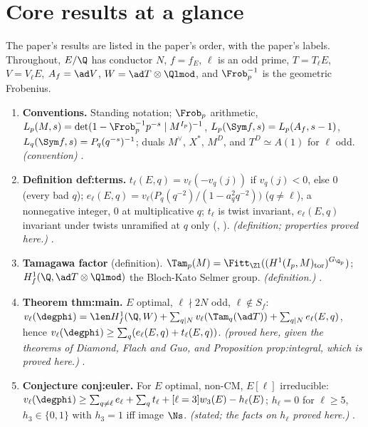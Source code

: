 \begin{sloppypar}
\section*{Core results at a glance}

The paper's results are listed in the paper's order, with the paper's labels. Throughout, $E/\Q$ has conductor $N$, $f=f_E$, $\ell$ is an odd prime,
$T=T_\ell E$, $V=V_\ell E$, $A_f=\ad V$, $W=\ad T\otimes\Qlmod$, and $\Frob_p^{-1}$ is the geometric Frobenius.

\begin{enumerate}[label=\textbf{\thechapter.\arabic*}]
\item \textbf{Conventions.} Standing notation; $\Frob_p$ arithmetic, $L_p(M,s)=\det(1-\Frob_p^{-1}p^{-s}\mid M^{I_p})^{-1}$, $L_p(\Sym f,s)=L_p(A_f,s-1)$, $L_q(\Sym f,s)=P_q(q^{-s})^{-1}$; duals
$M^\vee$, $X^*$, $M^D$, and $T^D\simeq A(1)$ for $\ell$ odd. \emph{(convention)} .
\item \textbf{Definition def:terms.} $t_\ell(E,q)=v_\ell(-v_q(j))$ if $v_q(j)<0$, else $0$ (every bad $q$); $e_\ell(E,q)=v_\ell\bigl(P_q(q^{-2})/(1-a_q^2q^{-2})\bigr)$ ($q\ne\ell$), a nonnegative integer, $0$ at
multiplicative $q$; $t_\ell$ is twist invariant, $e_\ell(E,q)$ invariant under twists unramified at $q$ only (, ). \emph{(definition; properties proved here.)} .
\item \textbf{Tamagawa factor} (definition). $\Tam_p(M)=\Fitt_{\Zl}((H^1(I_p,M)_{\mathrm{tor}})^{G_{\Q_p}})$; $H^1_f(\Q,\ad T\otimes\Qlmod)$ the Bloch-Kato Selmer group. \emph{(definition.)} .
\item \textbf{Theorem thm:main.} $E$ optimal, $\ell\nmid2N$ odd, $\ell\notin S_f$: $v_\ell(\degphi)=\len H^1_f(\Q,W)+\sum_{q\mid N}v_\ell(\Tam_q(\ad T))+\sum_{q\mid N}e_\ell(E,q)$, hence
$v_\ell(\degphi)\ge\sum_q(e_\ell(E,q)+t_\ell(E,q))$. \emph{(proved here, given the theorems of Diamond, Flach and Guo, \cite[Theorem 2.2]{ARS12} and Proposition prop:integral, which is proved here.)}
.
\item \textbf{Conjecture conj:euler.} For $E$ optimal, non-CM, $E[\ell]$ irreducible: $v_\ell(\degphi)\ge\sum_{q\ne\ell}e_\ell+\sum_qt_\ell+[\ell=3]w_3(E)-h_\ell(E)$; $h_\ell=0$ for $\ell\ge5$, $h_3\in\{0,1\}$ with $h_3=1$ iff
image $\Ns$. \emph{(stated; the facts on $h_\ell$ proved here.)} .

\end{enumerate}
\end{sloppypar}
